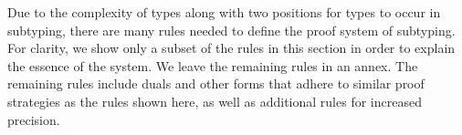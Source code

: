 \documentclass[acmsmall]{acmart}
\theoremstyle{definition}
\begin{document}
Due to the complexity of types along with two positions for types to occur in subtyping,
there are many rules needed to define the proof system of subtyping. For clarity,
we show only a subset of the rules in this section in order to explain the essence of the system.
We leave the remaining rules in an annex. 
The remaining rules include duals and other forms that adhere to similar proof strategies as the rules shown here,
as well as additional rules for increased precision.  




\end{document}

